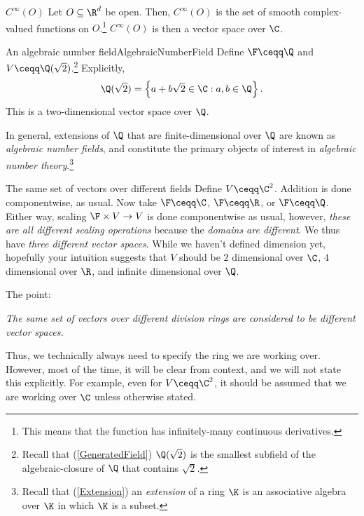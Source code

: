 \begin{exm}{$C^{\infty}(O)$}{}
	Let $O\subseteq \R ^d$ be open.  Then, $C^{\infty}(O)$ is the set of smooth complex-valued functions on $O$.\footnote{This means that the function has infinitely-many continuous derivatives.}  $C^{\infty}(O)$ is then a vector space over $\C$.
\end{exm}
\begin{exm}{An algebraic number field}{AlgebraicNumberField}
	Define $\F \ceqq \Q$ and $V\ceqq \Q (\sqrt{2})$.\footnote{Recall that (\cref{GeneratedField}) $\Q (\sqrt{2})$ is the smallest subfield of the algebraic-closure of $\Q$ that contains $\sqrt{2}$.}  Explicitly,
	\begin{equation}
		\Q (\sqrt{2})=\left\{ a+b\sqrt{2}\in \C :a,b\in \Q \right\} .
	\end{equation}
	This is a two-dimensional vector space over $\Q$.
	\begin{rmk}
		In general, extensions of $\Q$ that are finite-dimensional over $\Q$ are known as \emph{algebraic number fields}, and constitute the primary objects of interest in \emph{algebraic number theory}.\footnote{Recall that (\cref{Extension}) an \emph{extension} of a ring $\K$ is an associative algebra over $\K$ in which $\K$ is a subset.}
	\end{rmk}
\end{exm}
\begin{exm}{The same set of vectors over different fields}{}
	Define $V\ceqq \C ^2$.  Addition is done componentwise, as usual.  Now take $\F \ceqq \C$, $\F \ceqq \R$, or $\F \ceqq \Q$.  Either way, scaling $\F \times V\rightarrow V$ is done componentwise as usual, however, \emph{these are all different scaling operations} because the \emph{domains are different}.  We thus have \emph{three different vector spaces}.  While we haven't defined dimension yet, hopefully your intuition suggests that $V$ should be $2$ dimensional over $\C$, $4$ dimensional over $\R$, and infinite dimensional over $\Q$.
	
	The point:
	\begin{displayquote}
		\emph{The same set of vectors over different division rings are considered to be different vector spaces.}
	\end{displayquote}
	\begin{rmk}
		Thus, we technically always need to specify the ring we are working over.  However, most of the time, it will be clear from context, and we will not state this explicitly.  For example, even for $V\ceqq \C ^2$, it should be assumed that we are working over $\C$ unless otherwise stated.
	\end{rmk}
\end{exm}

